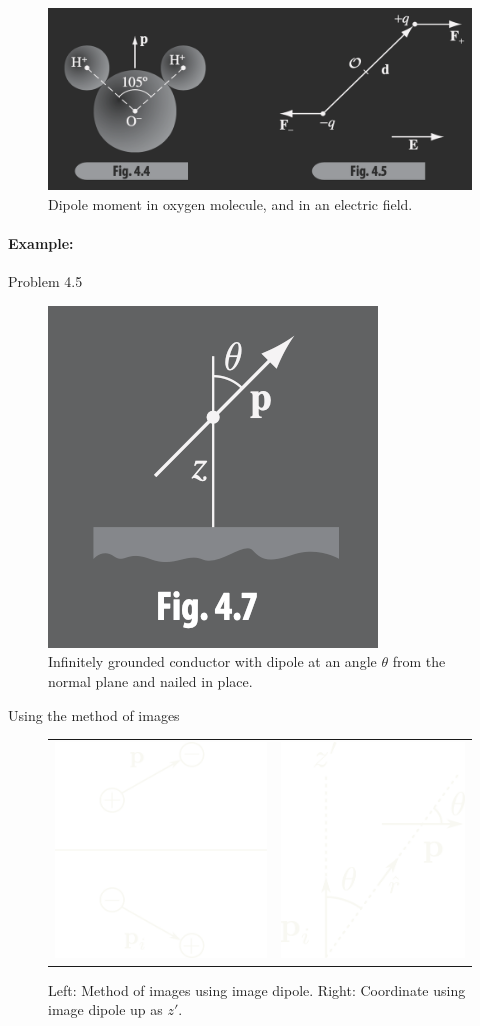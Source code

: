 \documentclass[../main.tex]{subfiles}
\begin{document}
\begin{figure}[ht]
    \centering
    \includegraphics[width=0.5\linewidth]{fig4_4_5.png}
    \caption{Dipole moment in oxygen molecule, and in an electric field.}
    \label{fig:4_4_5}
\end{figure}

\paragraph{Example:} Problem 4.5
\begin{figure}[ht]
    \centering
    \includegraphics[width=0.3\linewidth]{fig4_7.png}
    \caption{Infinitely grounded conductor with dipole at an angle $\theta$ from the normal plane and nailed in place.}
    \label{fig:fig4_7}
\end{figure}
Using the method of images %
\begin{figure}
    \centering
    \begin{tabular}{c c}
        \includegraphics[width=0.3\linewidth]{fig4_7a.png} & \includegraphics[width=0.3\linewidth]{fig4_7b.png}
    \end{tabular}
    \caption{Left: Method of images using image dipole. Right: Coordinate using image dipole up as $z'$.}
\end{figure}
\end{document}
